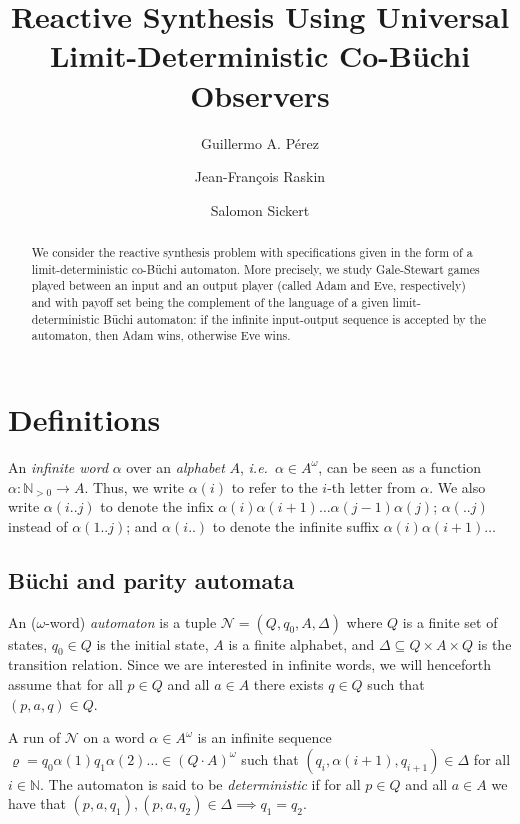\documentclass[draft]{llncs}
\let\rho\varrho
\newcommand{\ie}{\textit{i.e.}\xspace}
\newcommand{\eve}{Eve\xspace}
\newcommand{\adam}{Adam\xspace}
\newcommand{\calN}{\mathcal{N}}
\begin{document}
\frontmatter

\title{Reactive Synthesis Using Universal Limit-Deterministic Co-B\"uchi
Observers}
\author{Guillermo A. P\'erez \and Jean-Fran\c{c}ois Raskin
\and Salomon Sickert}

\maketitle

\begin{abstract}
	We consider the reactive synthesis problem with specifications given in
	the form of a limit-deterministic co-B\"uchi automaton. More precisely, we
	study Gale-Stewart games played between an input and an output player
	(called \adam and \eve, respectively) and with payoff set being the
	complement of the language of a given limit-deterministic B\"uchi
	automaton: if the infinite input-output sequence is accepted by the
	automaton, then \adam wins, otherwise \eve wins.
\end{abstract}

\section{Definitions}
An \emph{infinite word} $\alpha$ over an \emph{alphabet} $A$, \ie~$\alpha \in
A^\omega$, can be seen as a function $\alpha : \mathbb{N}_{> 0} \to A$. Thus, we
write $\alpha(i)$ to refer to the $i$-th letter from $\alpha$. We also write
$\alpha(i..j)$ to denote the infix
$\alpha(i)\alpha(i+1)\dots\alpha(j-1)\alpha(j)$; $\alpha(..j)$ instead of
$\alpha(1..j)$; and $\alpha(i..)$ to denote the infinite suffix
$\alpha(i)\alpha(i+1)\ldots$

\subsection{B\"uchi and parity automata}
\begin{definition}
    An ($\omega$-word) \emph{automaton} is a tuple $\calN =
    (Q,q_0,A,\Delta)$ where $Q$ is a finite set of states, $q_0 \in Q$ is the
    initial state, $A$ is a finite alphabet, and $\Delta \subseteq Q \times A
    \times Q$ is the transition relation. Since we are interested in infinite
    words, we will henceforth assume that for all $p \in Q$ and all $a \in A$
    there exists $q \in Q$ such that $(p,a,q) \in Q$.
\end{definition}
A run of $\calN$ on a word $\alpha \in A^\omega$ is an infinite sequence $\rho =
q_0 \alpha(1) q_1 \alpha(2) \dots \in (Q\cdot A)^\omega$ such that
$(q_i,\alpha(i+1),q_{i+1}) \in \Delta$ for all $i \in \mathbb{N}$. The automaton
is said to be \emph{deterministic} if for all $p \in Q$ and all $a \in A$ we
have that $(p,a,q_1), (p,a,q_2) \in \Delta \implies q_1 = q_2$.
\end{document}
